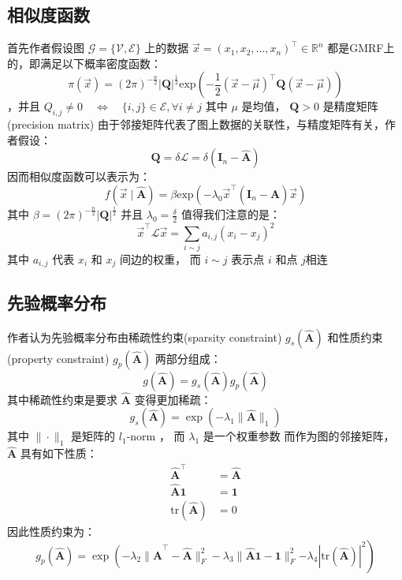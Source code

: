 \documentclass[color=gray,base=hide,cn]{elegantbook}
\begin{document}
\subsection{相似度函数}
首先作者假设图 $\mathcal{G}=\{\mathcal{V},\mathcal{E}\}$ 上的数据 $\vec{x} = (x_1, x_2, ..., x_n)^\top \in \mathbb{R}^n$  都是GMRF上的，即满足以下概率密度函数：
\begin{equation}
\pi(\vec{x}) = (2\pi)^{-\frac{n}{2}}|\mathbf{Q}|^{\frac{1}{2}} \text{exp}\left(-\frac{1}{2}(\vec{x}-\vec{\mu})^\top\mathbf{Q}(\vec{x}-\vec{\mu})\right)
\end{equation}
，并且 $Q_{i,j} \neq 0 \quad \Longleftrightarrow \quad \{i,j\} \in \mathcal{E}, \forall i \neq j$ 
其中 $\mu$ 是均值， $\mathbf{Q} > 0$ 是精度矩阵(precision matrix)
由于邻接矩阵代表了图上数据的关联性，与精度矩阵有关，作者假设：
\begin{equation}
\mathbf{Q} = \delta \mathcal{L} = \delta (\mathbf{I}_n - \mathbf{\hat{A}})
\end{equation}
因而相似度函数可以表示为：
\begin{equation}
 f(\vec{x} \mid \mathbf{\hat{A}}) =\beta \text{exp} \left(-\lambda_0 \vec{x}^\top ( \mathbf{I}_n - \mathbf{\hat{A}} ) \vec{x} \right)
\end{equation}
其中 $\beta=(2\pi)^{-\frac{n}{2}}|\mathbf{Q}|^{\frac{1}{2}}$ 并且 $\lambda_0 = \frac{\delta}{2}$
值得我们注意的是：
\begin{equation}
\vec{x}^\top \mathcal{L} \vec{x} = \sum\limits_{i \sim j}a_{i,j}(x_i - x_j)^2
\end{equation}
其中 $a_{i,j}$ 代表 $x_i$ 和 $x_j$ 间边的权重， 而 $i \sim j$ 表示点 $i$ 和点 $j$相连
\subsection{先验概率分布}
作者认为先验概率分布由稀疏性约束(sparsity constraint) $ g_s(\mathbf{\hat{A}})$ 和性质约束(property constraint) $g_p(\mathbf{\hat{A}})$ 两部分组成：
\begin{equation}
g(\mathbf{\hat{A}}) = g_s(\mathbf{\hat{A}})g_p(\mathbf{\hat{A}})
\end{equation}
其中稀疏性约束是要求 $\mathbf{\hat{A}}$ 变得更加稀疏：
\begin{equation}
g_s(\mathbf{\hat{A}}) = \exp \left( -\lambda_1 \| \mathbf{\hat{A}} \|_1 \right)
\end{equation}
其中 $\| \cdot \|_1$ 是矩阵的 $l_1$-norm ， 而 $\lambda_1$ 是一个权重参数
而作为图的邻接矩阵， $\mathbf{\hat{A}}$ 具有如下性质：
\begin{align}
\mathbf{\hat{A}}^\top  & = \mathbf{\hat{A}}\\
\mathbf{\hat{A}}\mathbf{1}  & = \mathbf{1}\\
\text{tr}(\mathbf{\hat{A}}) & = 0
\end{align}
因此性质约束为：
\begin{equation}
g_p(\mathbf{\hat{A}}) = \exp \left( -\lambda_2 \| \mathbf{\hat{A}}^\top - \mathbf{\hat{A}} \|_F^2 -\lambda_3 \| \mathbf{\hat{A}}\mathbf{1} - \mathbf{1} \|_F^2 \right. \left. -\lambda_4 | \text{tr}(\mathbf{\hat{A}}) |^2 \right)
\end{equation}
\end{document}
